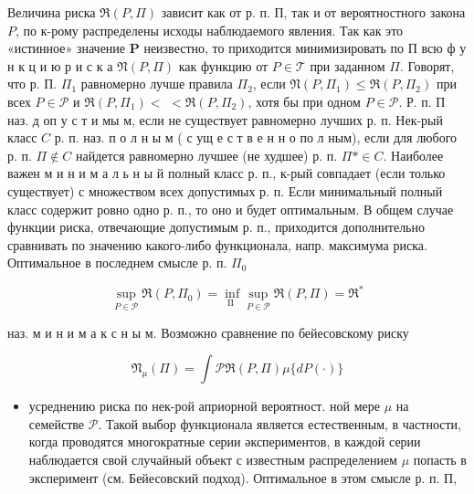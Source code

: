 \documentclass[10pt]{article}
\begin{document}
Величина риска $\mathfrak{R}(P, \Pi)$ зависит как от р. п. П, так и от вероятностного закона $P$, по к-рому распределены исходы наблюдаемого явления. Так как это «истинное» значение $\boldsymbol{P}$ неизвестно, то приходится минимизировать по П всю ф у н к ц и ю р и с к а $\mathfrak{N}(P, \Pi)$ как функцию от $P \in \mathscr{T}$ при заданном $\Pi$. Говорят, что р. П. $\Pi_{1}$ равномерно лучше правила $\Pi_{2}$, если $\mathfrak{N}\left(P, \Pi_{1}\right) \leqslant \mathfrak{R}\left(P, \Pi_{2}\right)$ при всех $P \in \mathscr{P}$ и $\mathfrak{R}\left(P, \Pi_{1}\right)<$ $<\mathfrak{\Re}\left(P, \Pi_{2}\right)$, хотя бы при одном $P \in \mathscr{P}$. Р. п. П наз. д оп у с т и мы м, если не существует равномерно лучших р. п. Нек-рый класс $C$ р. п. наз. п о л н ы м ( с ущ е с т в е н н о по л ным), если для любого р. п. $\Pi \notin C$ найдется равномерно лучшее (не худшее) р. п. $\Pi * \in C$. Наиболее важен м и н и м а л ь н ы й полный класс р. п., к-рый совпадает (если только существует) с множеством всех допустимых р. п. Если минимальный полный класс содержит ровно одно р. п., то оно и будет оптимальным. В общем случае функции риска, отвечающие допустимым р. п., приходится дополнительно сравнивать по значению какого-либо функционала, напр. максимума риска. Оптимальное в последнем смысле р. п. $\Pi_{0}$



\[

\sup _{P \in \mathscr{P}} \mathfrak{R}\left(P, \Pi_{0}\right)=\inf _{\text {II }} \sup _{P \in \mathscr{P}} \mathfrak{R}(P, \Pi)=\mathfrak{R}^{*}

\]



наз. м и н и м а к с н ы м. Возможно сравнение по бейесовскому риску



\[

\mathfrak{N}_{\mu}(\Pi)=\int \mathscr{P} \mathfrak{R}(P, \Pi) \mu\{d P(\cdot)\}

\]



\begin{itemize}

  \item усреднению риска по нек-рой априорной вероятност. ной мере $\mu$ на семействе $\mathscr{P}$. Такой выбор функционала является естественным, в частности, когда проводятся многократные серии әкспериментов, в каждой серии наблюдается свой случайный объект с известным распределением $\mu$ попасть в эксперимент (см. Бейесовский подход). Оптимальное в этом смысле р. п. П,

\end{itemize}
\end{document}
